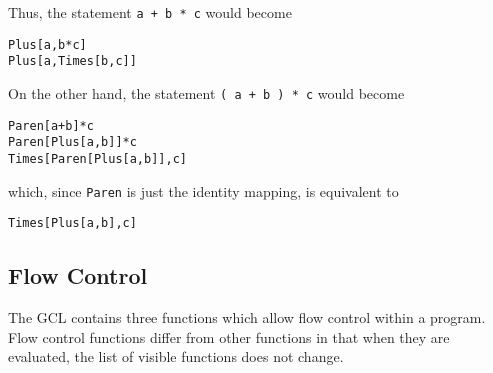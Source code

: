 Thus, the statement \verb&a + b * c& would become 
\begin{verbatim}
Plus[a,b*c]
Plus[a,Times[b,c]]
\end{verbatim}

\noindent
On the other hand, the statement \verb&( a + b ) * c& would become 
\begin{verbatim}
Paren[a+b]*c
Paren[Plus[a,b]]*c
Times[Paren[Plus[a,b]],c]
\end{verbatim}

\noindent
which, since \verb+Paren+ is just the identity mapping, is equivalent to
\begin{verbatim}
Times[Plus[a,b],c]
\end{verbatim}

\subsection{Flow Control}

The GCL contains three functions which allow flow control within a
program.  Flow control functions differ from other functions in that
when they are evaluated, the list of visible functions does not
change.

\medskip

